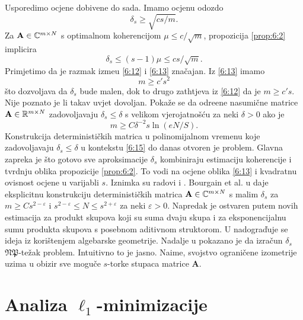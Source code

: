 \documentclass[a4paper,twoside,12pt]{memoir} %
\newcommand{\vect}[1]{\mathbf{#1}}
\renewcommand{\vec}{\vect}
\begin{document}
Usporedimo ocjene dobivene do sada. Imamo ocjenu odozdo
\begin{equation}\label{6:12}
    \delta_s \geq \sqrt{cs/m}. 
\end{equation}
Za $\vec A \in \C^{m \times N}$ s optimalnom koherencijom $\mu \leq c/\sqrt{m}$, propozicija \ref{prop:6:2} implicira
\begin{equation}\label{6:13}
    \delta_s \leq (s-1)\mu \leq cs/\sqrt{m}. 
\end{equation}
Primjetimo da je razmak izme\dj u \eqref{6:12} i \eqref{6:13} zna\v{c}ajan. Iz \eqref{6:13} imamo
\begin{equation}\label{6:14}
    m \geq c' s^2
\end{equation}
\v{s}to dozvoljava da $\delta_s$ bude malen, dok to drugo zathtjeva iz \eqref{6:12} da je $m \geq c's$. Nije poznato je li takav uvjet dovoljan. Poka\v{z}e se da odre\dj ene nasumi\v{c}ne matrice $\vec A \in \R^{m \times N}$ zadovoljavaju $\delta_s \leq \delta$ s velikom vjerojatno\v{s}\'cu za neki $\delta > 0$ ako je
\begin{equation}\label{6:15}
    m \geq C \delta^{-2}s \ln(eN/S).
\end{equation}
Konstrukcija deterministi\v{c}kih matrica u polinomijalnom vremenu koje zadovoljavaju $\delta_s \leq \delta$ u kontekstu \eqref{6:15} do danas otvoren je problem. Glavna zapreka je \v{s}to gotovo sve aproksimacije $\delta_s$ kombiniraju estimaciju koherencije i tvrdnju oblika propozicije \ref{prop:6:2}. To vodi na ocjene oblika \eqref{6:13} i kvadratnu ovisnost ocjene u varijabli $s$. Iznimka su radovi \cite{2010arXiv1008.4535B} i \cite{DBLP:journals/corr/Chen15n}. Bourgain et al. u \cite{2010arXiv1008.4535B} daje eksplicitnu konstrukciju deterministi\v{c}kih matrica $\vec A \in \C^{m \times N}$ s malim $\delta_s$ za $m \geq Cs^{2-\varepsilon}$ i $ s^{2-\varepsilon} \leq N \leq s^{2+\varepsilon}$ za neki $\varepsilon > 0$. Napredak je ostvaren putem novih estimacija za produkt skupova koji su suma dvaju skupa i za eksponencijalnu sumu produkta skupova s posebnom aditivnom struktorom. U \cite{DBLP:journals/corr/Chen15n} nadogra\v{d}uje se ideja iz \cite{2010arXiv1008.4535B} kori\v{s}tenjem algebarske geometrije. Nadalje u \cite{2012arXiv1205.2081T} pokazano je da izra\v{c}un $\delta_s$ $\mathfrak{NP}$-te\v{z}ak problem. Intuitivno to je jasno. Naime, svojstvo ograni\v{c}ene izometrije uzima u obizir sve mogu\v{c}e $s$-torke stupaca matrice $\vec A$.

\newpage
\section[Analiza $\ell_1$-minimizacije][Analiza $\ell_1$-minimizacije]{Analiza $\ell_1$-minimizacije}
\end{document}
